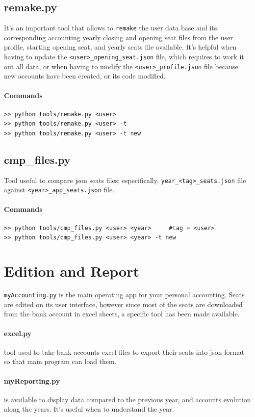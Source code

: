 \documentclass[12pt, a4paper]{article}
\begin{document}
\subsection{remake.py}
It's an important tool that allows to \verb!remake! the user data base and its corresponding accounting yearly closing and opening seat files from the user profile, starting opening seat, and yearly seats file available.
It's helpful when having to update the \verb!<user>_opening_seat.json! file, which requires to work it out all data, or when having to modify the \verb!<user>_profile.json! file because new accounts have been created, or its code modified.
\paragraph{Commands}
\begin{verbatim}
>> python tools/remake.py <user>   
>> python tools/remake.py <user> -t     
>> python tools/remake.py <user> -t new  
\end{verbatim}
\subsection{cmp\_files.py} 
Tool useful to compare json seats files; especifically, \verb!year_<tag>_seats.json! file against \verb!<year>_app_seats.json! file.
\paragraph{Commands}
\begin{verbatim}
>> python tools/cmp_files.py <user> <year>     #tag = <user>
>> python tools/cmp_files.py <user> <year> -t new
\end{verbatim}
  \section{Edition and Report}
  \verb!myAccounting.py! is the main operating app for your personal accounting. 
  Seats are edited on its user interface, however since most of the seats are downloaded from the bank account in excel sheets, a specific tool has been made available.
 \paragraph{excel.py} tool used to take bank accounts excel files to export their seats into json format so that main program can load them. 
 \paragraph{myReporting.py} is available to display data compared to the previous year, and accounts evolution along the years. It's useful when to understand the year.
 
\end{document}

